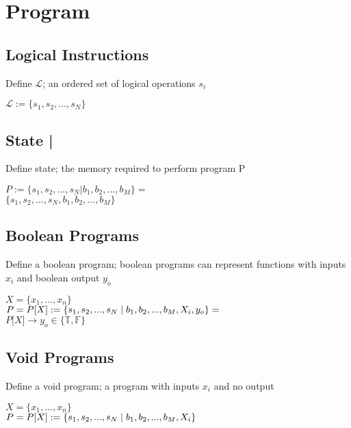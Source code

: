 \documentclass[11pt]{article}
\begin{document}
\section{Program}
\subsection{Logical Instructions}
Define $\mathcal{L}$; an ordered set of logical operations $s_i$
\begin{center}
$
\mathcal{L} := \{ s_1,s_2,...,s_{N}\}
$
\end{center}





\subsection{State |}
Define state; the memory required to perform program P
\begin{center}
$
P := \{ s_1, s_2,...,s_{N} | b_1, b_2,...,b_M\} =
$
\\ \vspace{2mm}
$
\{ s_1, s_2,...,s_{N}, b_1, b_2,...,b_M\}
$
\end{center}





\subsection{Boolean Programs}
Define a boolean program; boolean programs can represent functions with inputs $x_i$ and boolean output $y_o$
\begin{center}
$
X = \{x_1,...,x_n\}
$
\\ \vspace{2mm}
$P = P\lbrack X \rbrack := \{ s_1,s_2,...,s_{N}\hspace{1mm}|\hspace{1mm} b_1, b_2,...,b_M,X_i,y_o\}=$
\\ \vspace{2mm}
$
P\lbrack X \rbrack \rightarrow y_o \in \{ \mathbb{T},\mathbb{F}\}
$
\end{center}





\subsection{Void Programs}
Define a void program; a program with inputs $x_i$ and no output
\begin{center}
$
X = \{x_1,...,x_n\}
$
\\ \vspace{2mm}
$P = P\lbrack X \rbrack := \{ s_1,s_2,...,s_{N}\hspace{1mm}|\hspace{1mm} b_1, b_2,...,b_M,X_i\}$
\end{center}
\end{document}
